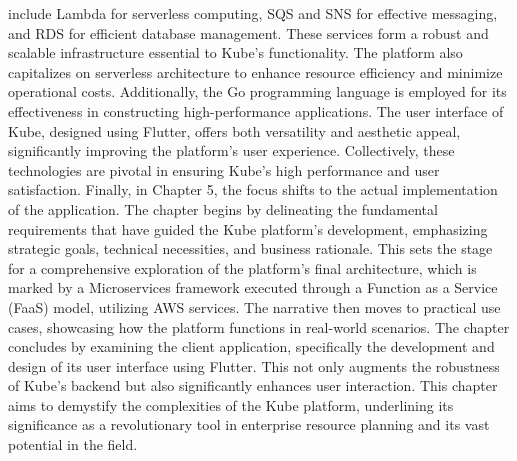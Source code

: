 include Lambda for serverless computing, SQS and SNS for effective messaging, and RDS for efficient
database management. These services form a robust and scalable infrastructure essential to Kube's
functionality. The platform also capitalizes on serverless architecture to enhance resource
efficiency and minimize operational costs. Additionally, the Go programming language is employed for
its effectiveness in constructing high-performance applications. The user interface of Kube,
designed using Flutter, offers both versatility and aesthetic appeal, significantly improving the
platform's user experience. Collectively, these technologies are pivotal in ensuring Kube’s high
performance and user satisfaction.
\newline\newline
Finally, in Chapter 5, the focus shifts to the actual implementation of the application. The chapter
begins by delineating the fundamental requirements that have guided the Kube platform's development,
emphasizing strategic goals, technical necessities, and business rationale. This sets the stage for
a comprehensive exploration of the platform’s final architecture, which is marked by a Microservices
framework executed through a Function as a Service (FaaS) model, utilizing AWS services. The
narrative then moves to practical use cases, showcasing how the platform functions in real-world
scenarios. The chapter concludes by examining the client application, specifically the development
and design of its user interface using Flutter. This not only augments the robustness of Kube's
backend but also significantly enhances user interaction. This chapter aims to demystify the
complexities of the Kube platform, underlining its significance as a revolutionary tool in
enterprise resource planning and its vast potential in the field.
